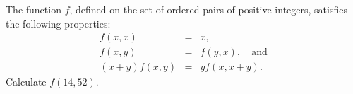 The function $f$, defined on the set of ordered pairs of positive integers, satisfies the following properties:
\begin{eqnarray*} f(x,x) &=& x, \\ f(x,y) &=& f(y,x), \quad \text{and} \\ (x + y) f(x,y) &=& yf(x,x + y). \end{eqnarray*}
Calculate $f(14,52)$.